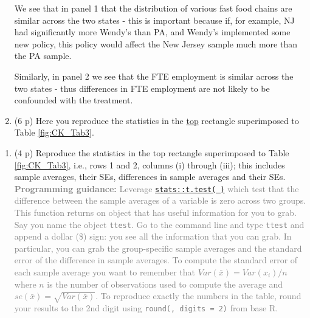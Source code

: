 \documentclass[
]{article}
\providecommand{\tightlist}{%
  \setlength{\itemsep}{0pt}\setlength{\parskip}{0pt}}
\begin{document}
\begin{enumerate}
  We see that in panel 1 that the distribution of various fast food
  chains are similar across the two states - this is important because
  if, for example, NJ had significantly more Wendy's than PA, and
  Wendy's implemented some new policy, this policy would affect the New
  Jersey sample much more than the PA sample.

  Similarly, in panel 2 we see that the FTE employment is similar across
  the two states - thus differences in FTE employment are not likely to
  be confounded with the treatment.
\item
  (6 p) Here you reproduce the statistics in the \underline{top}
  rectangle superimposed to Table
  \ref{fig:CK_Tab3}.\label{item:table3-rows-1-2}
\end{enumerate}

\begin{enumerate}
\def\labelenumi{\alph{enumi}.}
\tightlist
\item
  (4 p) Reproduce the statistics in the top rectangle superimposed to
  Table \ref{fig:CK_Tab3}, i.e., rows 1 and 2, columns (i) through
  (iii); this includes sample averages, their SEs, differences in sample
  averages and their SEs.
  \textcolor{gray}{\textbf{Programming guidance:} Leverage \href{https://www.rdocumentation.org/packages/stats/versions/3.6.2/topics/t.test}{\texttt{stats::t.test( )}} which test that the difference between the sample averages of a variable is zero across two groups. This function returns on object that has useful information for you to grab. Say you name the object \texttt{ttest}. Go to the command line and type \texttt{ttest} and append a dollar (\$) sign: you see all the information that you can grab. In particular, you can grab the group-specific sample averages and the standard error of the difference in sample averages. To compute the standard error of each sample average you want to remember that $Var(\bar{x})=Var(x_i)/n$ where $n$ is the number of observations used to compute the average and $se(\bar{x})=\sqrt{Var(\bar{x})}$. To reproduce exactly the numbers in the table, round your results to the 2nd digit using \texttt{round(, digits = 2)} from base R. }
\end{enumerate}
\end{document}
